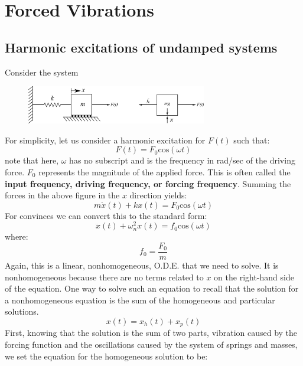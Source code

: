 \documentclass[12pt,letter]{article}
\numberwithin{ex}{section} %
\begin{document}
		\section{Forced Vibrations}

	
		\subsection{Harmonic excitations of undamped systems}

			Consider the system
			\begin{figure}[H]
				\centering
				\includegraphics[width=0.7\textwidth]{../Figures/forced_spring_mass_system_with_FBD.png}
			\end{figure}	
			For simplicity, let us consider a harmonic excitation for $F(t)$ such that:
			\begin{equation}
				F(t) = F_0\text{cos}(\omega t)
			\end{equation}							
			note that here, $\omega$ has no subscript and is the frequency in rad/sec of the driving force. $F_0$ represents the magnitude of the applied force. This is often called the \textbf{input frequency, driving frequency, or forcing frequency}. Summing the forces in the above figure in the $x$ direction yields:
			\begin{equation}
				m \ddot{x}(t)+kx(t) = F_0\text{cos}(\omega t)
			\end{equation}			
			For convinces we can convert this to the standard form:					
			\begin{equation}
				\ddot{x}(t)+\omega_n^2x(t) = f_0\text{cos}(\omega t)
			\end{equation}					
			where:
			\begin{equation}
				f_0 = \frac{F_0}{m}
			\end{equation}	
			Again, this is a linear, nonhomogeneous, O.D.E. that we need to solve. It is nonhomogeneous because there are no terms related to $x$ on the right-hand side of the equation. One way to solve such an equation to recall that the solution for a nonhomogeneous equation is the sum of the homogeneous and particular solutions. 
			\begin{equation}
				x(t) = x_h(t) + x_p(t)
			\end{equation}	
			First, knowing that the solution is the sum of two parts, vibration caused by the forcing function and the oscillations caused by the system of springs and masses, we set the equation for the homogeneous solution to be:
\end{document}
